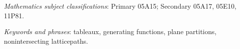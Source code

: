 \eightpoint{} {\it Mathematics subject classifications}: Primary 05A15;
 Secondary 05A17, 05E10, 11P81.

\noindent
{\it Keywords and phrases}: tableaux, generating functions, plane partitions,
nonintersecting lattice\linebreak paths.

\enddocument
